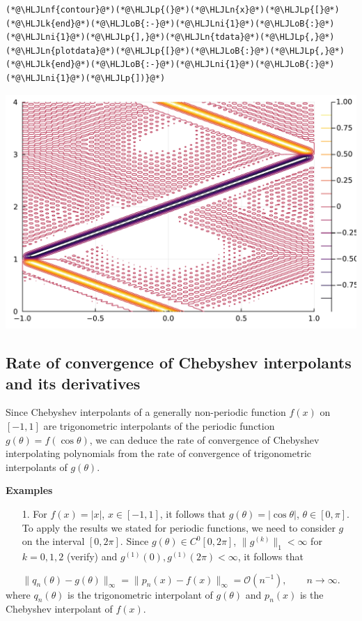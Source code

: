 \documentclass[12pt,a4paper]{article}
\newcommand{\HLJLk}[1]{\textcolor[RGB]{148,91,176}{\textbf{#1}}}
\newcommand{\HLJLn}[1]{#1}
\newcommand{\HLJLnf}[1]{\textcolor[RGB]{66,102,213}{#1}}
\newcommand{\HLJLni}[1]{\textcolor[RGB]{59,151,46}{#1}}
\newcommand{\HLJLoB}[1]{\textcolor[RGB]{102,102,102}{\textbf{#1}}}
\newcommand{\HLJLp}[1]{#1}
\begin{document}
\begin{lstlisting}
(*@\HLJLnf{contour}@*)(*@\HLJLp{(}@*)(*@\HLJLn{x}@*)(*@\HLJLp{[}@*)(*@\HLJLk{end}@*)(*@\HLJLoB{:-}@*)(*@\HLJLni{1}@*)(*@\HLJLoB{:}@*)(*@\HLJLni{1}@*)(*@\HLJLp{],}@*)(*@\HLJLn{tdata}@*)(*@\HLJLp{,}@*)(*@\HLJLn{plotdata}@*)(*@\HLJLp{[}@*)(*@\HLJLoB{:}@*)(*@\HLJLp{,}@*)(*@\HLJLk{end}@*)(*@\HLJLoB{:-}@*)(*@\HLJLni{1}@*)(*@\HLJLoB{:}@*)(*@\HLJLni{1}@*)(*@\HLJLp{])}@*)
\end{lstlisting}

\includegraphics[width=\linewidth]{jl_QN8l93/Chebyshev_14_1.pdf}

\subsection{Rate of convergence of Chebyshev interpolants and its derivatives}
Since Chebyshev interpolants of a generally non-periodic function $f(x)$ on $[-1, 1]$ are trigonometric interpolants of the periodic function $g(\theta) = f(\cos\theta)$, we can deduce the rate of convergence of Chebyshev interpolating polynomials from the rate of convergence of trigonometric interpolants of $g(\theta)$.

\textbf{Examples}

\begin{itemize}
\item[1. ] For $f(x) = \vert x \vert$, $x \in [-1, 1]$, it follows that $g(\theta) = \vert \cos\theta \vert$, $\theta \in [0, \pi]$.  To apply the results we stated for periodic functions, we need to consider $g$ on the interval $[0, 2\pi]$.  Since $g(\theta) \in C^{0}[0, 2\pi]$, $\| g^{(k)}\|_1 < \infty$ for $k = 0, 1, 2$ (verify) and $g^{(1)}(0), g^{(1)}(2\pi) < \infty$, it follows that

\end{itemize}
\[
\| q_n(\theta) - g(\theta) \|_{\infty} = \| p_n(x) - f(x) \|_{\infty} = \mathcal{O}\left( n^{-1} \right), \qquad n \to \infty.
\]
where $q_n(\theta)$ is the trigonometric interpolant of $g(\theta)$ and $p_n(x)$ is the Chebyshev interpolant of $f(x)$.
\end{document}
